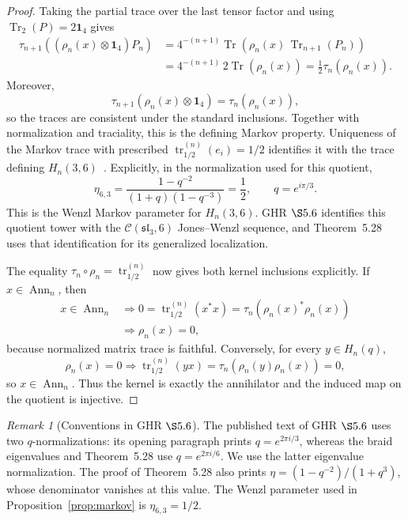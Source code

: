 \documentclass[11pt]{article}
\theoremstyle{remark}
\newtheorem{remark}[theorem]{Remark}
\newcommand{\Id}{\mathbf 1}
\newcommand{\Tr}{\operatorname{Tr}}
\newcommand{\cC}{\mathcal C}
\begin{document}
\begin{proof}
Taking the partial trace over the last tensor factor and using
\(\Tr_2(P)=2\Id_4\) gives
\[
\begin{aligned}
  \tau_{n+1}\!\left((\rho_n(x)\otimes\Id_4)P_n\right)
  &=
  4^{-(n+1)}
  \Tr\!\left(\rho_n(x)\,\Tr_{n+1}(P_n)\right)\\
  &=
  4^{-(n+1)}\,2\Tr(\rho_n(x))
   =\frac12\tau_n(\rho_n(x)).
\end{aligned}
\]
Moreover,
\[
  \tau_{n+1}(\rho_n(x)\otimes\Id_4)=\tau_n(\rho_n(x)),
\]
so the traces are consistent under the standard inclusions.
Together with normalization and traciality, this is the defining Markov
property.  Uniqueness of the Markov trace with prescribed
\(\operatorname{tr}^{(n)}_{1/2}(e_i)=1/2\) identifies it with the trace defining
\(H_n(3,6)\)~\cite[Eq.~(3.2)]{Wenzl1988}.  Explicitly, in the normalization
used for this quotient,
\[
  \eta_{6,3}
  =\frac{1-q^{-2}}{(1+q)(1-q^{-3})}
  =\frac12,
  \qquad q=e^{i\pi/3}.
\]
This is the Wenzl Markov parameter for \(H_n(3,6)\).  GHR \(\S5.6\) identifies
this quotient tower with the \(\cC(\mathfrak{sl}_3,6)\) Jones--Wenzl sequence,
and Theorem~5.28 uses that identification for its generalized localization.

The equality \(\tau_n\circ\rho_n=\operatorname{tr}^{(n)}_{1/2}\) now gives
both kernel inclusions explicitly.  If \(x\in\operatorname{Ann}_n\), then
\[
\begin{aligned}
  x\in\operatorname{Ann}_n
  &\Longrightarrow
  0=\operatorname{tr}^{(n)}_{1/2}(x^*x)
   =\tau_n\!\left(\rho_n(x)^*\rho_n(x)\right)\\
  &\Longrightarrow \rho_n(x)=0,
\end{aligned}
\]
because normalized matrix trace is faithful.  Conversely, for every
\(y\in H_n(q)\),
\[
  \rho_n(x)=0
  \Longrightarrow
  \operatorname{tr}^{(n)}_{1/2}(yx)
  =\tau_n\!\left(\rho_n(y)\rho_n(x)\right)=0,
\]
so \(x\in\operatorname{Ann}_n\).  Thus the kernel is exactly the annihilator
and the induced map on the quotient is injective.
\end{proof}

\begin{remark}[Conventions in GHR \(\S5.6\)]
The published text of GHR \(\S5.6\) uses two \(q\)-normalizations: its opening
paragraph prints \(q=e^{2\pi i/3}\), whereas the braid eigenvalues and
Theorem~5.28 use \(q=e^{2\pi i/6}\).  We use the latter eigenvalue
normalization.  The proof of Theorem~5.28 also prints
\(\eta=(1-q^{-2})/(1+q^3)\), whose denominator vanishes at this value.  The
Wenzl parameter used in Proposition~\ref{prop:markov} is
\(\eta_{6,3}=1/2\).
\end{remark}
\end{document}
